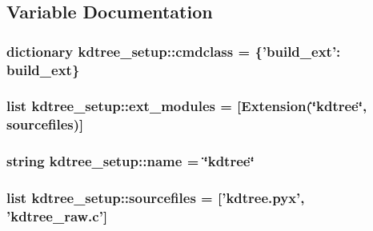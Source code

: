 \subsection{Variable Documentation}
\hypertarget{namespacekdtree__setup_aefcaebbabeda5e6a4ecf2a73db70c99a}{
\subsubsection[{cmdclass}]{\setlength{\rightskip}{0pt plus 5cm}dictionary {\bf kdtree\_\-setup::cmdclass} = \{'build\_\-ext': build\_\-ext\}}}
\label{namespacekdtree__setup_aefcaebbabeda5e6a4ecf2a73db70c99a}
\hypertarget{namespacekdtree__setup_a130a6b8035c5138496950a54d6c5fdd3}{
\subsubsection[{ext\_\-modules}]{\setlength{\rightskip}{0pt plus 5cm}list {\bf kdtree\_\-setup::ext\_\-modules} = \mbox{[}Extension(\char`\"{}kdtree\char`\"{}, sourcefiles)\mbox{]}}}
\label{namespacekdtree__setup_a130a6b8035c5138496950a54d6c5fdd3}
\hypertarget{namespacekdtree__setup_a7c264e573a15d7ce7bf7e39ad2d687f2}{
\subsubsection[{name}]{\setlength{\rightskip}{0pt plus 5cm}string {\bf kdtree\_\-setup::name} = \char`\"{}kdtree\char`\"{}}}
\label{namespacekdtree__setup_a7c264e573a15d7ce7bf7e39ad2d687f2}
\hypertarget{namespacekdtree__setup_a0dc55a4d893db5d7ca3db49b1ca91b76}{
\subsubsection[{sourcefiles}]{\setlength{\rightskip}{0pt plus 5cm}list {\bf kdtree\_\-setup::sourcefiles} = \mbox{[}'kdtree.pyx', 'kdtree\_\-raw.c'\mbox{]}}}
\label{namespacekdtree__setup_a0dc55a4d893db5d7ca3db49b1ca91b76}

